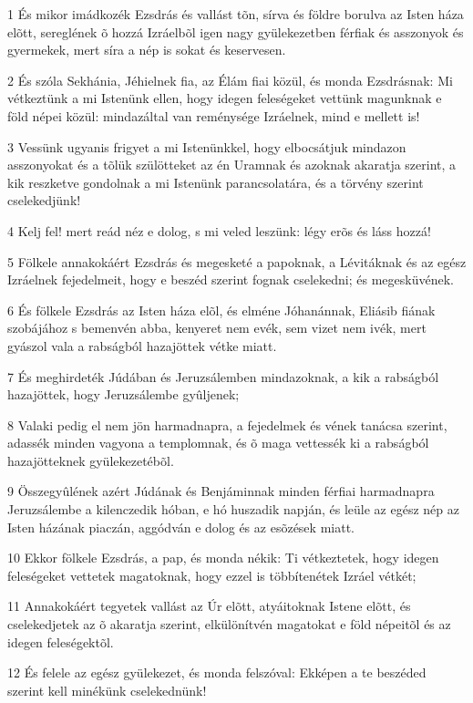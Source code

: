{\par 1 És mikor imádkozék Ezsdrás és vallást tõn, sírva és földre borulva az Isten háza elõtt, sereglének õ hozzá Izráelbõl igen nagy gyülekezetben férfiak és asszonyok és gyermekek, mert síra a nép is sokat és keservesen.
\par 2 És szóla Sekhánia, Jéhielnek fia, az Élám fiai közül, és monda Ezsdrásnak: Mi vétkeztünk a mi Istenünk ellen, hogy idegen feleségeket vettünk magunknak e föld népei közül: mindazáltal van reménysége Izráelnek, mind e mellett is!
\par 3 Vessünk ugyanis frigyet a mi Istenünkkel, hogy elbocsátjuk mindazon asszonyokat és a tõlük szülötteket az én Uramnak és azoknak akaratja szerint, a kik reszketve gondolnak a mi Istenünk parancsolatára, és a törvény szerint cselekedjünk!
\par 4 Kelj fel! mert reád néz e dolog, s mi veled leszünk: légy erõs és láss hozzá!
\par 5 Fölkele annakokáért Ezsdrás és megesketé a papoknak, a Lévitáknak és az egész Izráelnek fejedelmeit, hogy e beszéd szerint fognak cselekedni; és megesküvének.
\par 6 És fölkele Ezsdrás az Isten háza elõl, és elméne Jóhanánnak, Eliásib fiának szobájához s bemenvén abba, kenyeret nem evék, sem vizet nem ivék, mert gyászol vala a rabságból hazajöttek vétke miatt.
\par 7 És meghirdeték Júdában és Jeruzsálemben mindazoknak, a kik a rabságból hazajöttek, hogy Jeruzsálembe gyûljenek;
\par 8 Valaki pedig el nem jön harmadnapra, a fejedelmek és vének tanácsa szerint, adassék minden vagyona a templomnak, és õ maga vettessék ki a rabságból hazajötteknek gyülekezetébõl.
\par 9 Összegyûlének azért Júdának és Benjáminnak minden férfiai harmadnapra Jeruzsálembe a kilenczedik hóban, e hó huszadik napján, és leüle az egész nép az Isten házának piaczán, aggódván e dolog és az esõzések miatt.
\par 10 Ekkor fölkele Ezsdrás, a pap, és monda nékik: Ti vétkeztetek, hogy idegen feleségeket vettetek magatoknak, hogy ezzel is többítenétek Izráel vétkét;
\par 11 Annakokáért tegyetek vallást az Úr elõtt, atyáitoknak Istene elõtt, és cselekedjetek az õ akaratja szerint, elkülönítvén magatokat e föld népeitõl és az idegen feleségektõl.
\par 12 És felele az egész gyülekezet, és monda felszóval: Ekképen a te beszéded szerint kell minékünk cselekednünk!
}
